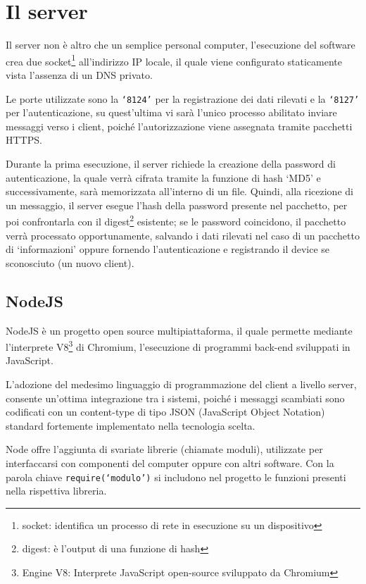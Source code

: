 \documentclass[target=bach]{thud}
\begin{document}
\newpage

    \section{Il server}

        Il server non è altro che un semplice personal computer, l'esecuzione del software crea due socket\footnote[1]{socket: identifica un processo di rete in esecuzione su un dispositivo} all'indirizzo IP locale, il quale viene configurato staticamente vista l'assenza di un DNS privato.

        Le porte utilizzate sono la \texttt{`8124'} per la registrazione dei dati rilevati e la \texttt{`8127'} per l'autenticazione, su quest'ultima vi sarà l'unico processo abilitato inviare messaggi verso i client, poiché l'autorizzazione viene assegnata tramite pacchetti HTTPS.

        Durante la prima esecuzione, il server richiede la creazione della password di autenticazione, la quale verrà cifrata tramite la funzione di hash `MD5' e successivamente, sarà memorizzata all'interno di un file.
        Quindi, alla ricezione di un messaggio, il server esegue l'hash della password presente nel pacchetto, per poi confrontarla con il digest\footnote[2]{digest: è l'output di una funzione di hash} esistente; se le password coincidono, il pacchetto verrà processato opportunamente, salvando i dati rilevati nel caso di un pacchetto di `informazioni' oppure fornendo l'autenticazione e registrando il device se sconosciuto (un nuovo client).




            \subsection{NodeJS}
                NodeJS è un progetto open source multipiattaforma, il quale permette mediante l'interprete V8\footnote[1]{Engine V8: Interprete JavaScript open-source sviluppato da Chromium} di Chromium, l'esecuzione di programmi back-end sviluppati in JavaScript.

                L'adozione del medesimo linguaggio di programmazione del client a livello server, consente un'ottima integrazione tra i sistemi, poiché i messaggi scambiati sono codificati con un content-type di tipo
                JSON (JavaScript Object Notation) standard fortemente implementato nella tecnologia scelta.

                Node offre l'aggiunta di svariate librerie (chiamate moduli), utilizzate per interfaccarsi con componenti del computer oppure con altri software. Con la parola chiave \texttt{require(`modulo')} si includono nel progetto le funzioni presenti nella rispettiva libreria.
\end{document}
